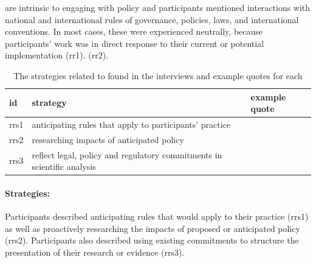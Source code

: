 \ismmr{} are intrinsic to engaging with policy and participants mentioned interactions with national and international rules of governance, policies, laws, and international conventions. In most cases, these were experienced neutrally, because participants' work was in direct response to their current or potential implementation (rr1).  (rr2).

\begin{table}[!ht]
\footnotesize
\caption{The strategies related to \ismmr{} found in the interviews and example quotes for each}\label{tab:resrulesstrat}
\begin{tabular}{L{.06\linewidth}L{.3\linewidth}L{.64\linewidth}} \hline
\textbf{id} & \textbf{strategy} & \textbf{example quote} \\ \hline \hline
rrs1 & anticipating rules that apply to participants' practice &  \\[5mm]
rrs2 & researching impacts of anticipated policy &  \\[5mm]
rrs3 & reflect legal, policy and regulatory commitments in scientific analysis &  \\[5mm] \hline
 \end{tabular}
\end{table}

\paragraph{Strategies:} Participants described anticipating rules that would apply to their practice (rrs1) as well as proactively researching the impacts of proposed or anticipated policy (rrs2). Participants also described using existing commitments to structure the presentation of their research or evidence (rrs3).

\subsubsection{\ismmt}\label{sec:restechnologies}

